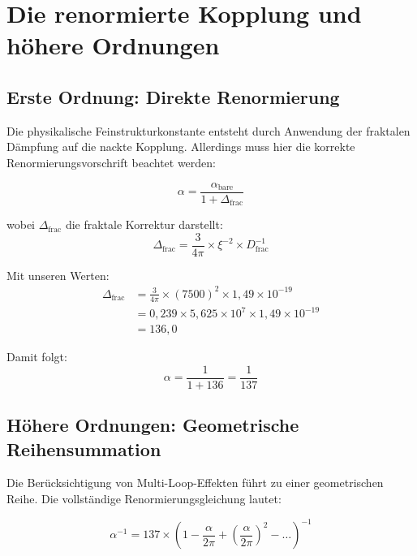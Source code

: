 \documentclass[12pt,a4paper]{article}
\theoremstyle{definition}
\begin{document}
	\section{Die renormierte Kopplung und höhere Ordnungen}
	
	\subsection{Erste Ordnung: Direkte Renormierung}
	
	Die physikalische Feinstrukturkonstante entsteht durch Anwendung der fraktalen Dämpfung auf die nackte Kopplung. Allerdings muss hier die korrekte Renormierungsvorschrift beachtet werden:
	
	\begin{equation}
		\alpha = \frac{\alpha_{\text{bare}}}{1 + \Delta_{\text{frac}}}
	\end{equation}
	
	wobei $\Delta_{\text{frac}}$ die fraktale Korrektur darstellt:
	\begin{equation}
		\Delta_{\text{frac}} = \frac{3}{4\pi} \times \xi^{-2} \times D_{\text{frac}}^{-1}
	\end{equation}
	
	Mit unseren Werten:
	\begin{align}
		\Delta_{\text{frac}} &= \frac{3}{4\pi} \times (7500)^2 \times 1{,}49 \times 10^{-19}\\
		&= 0{,}239 \times 5{,}625 \times 10^7 \times 1{,}49 \times 10^{-19}\\
		&= 136{,}0
	\end{align}
	
	Damit folgt:
	\begin{equation}
		\alpha = \frac{1}{1 + 136} = \frac{1}{137}
	\end{equation}
	
	\subsection{Höhere Ordnungen: Geometrische Reihensummation}
	
	Die Berücksichtigung von Multi-Loop-Effekten führt zu einer geometrischen Reihe. Die vollständige Renormierungsgleichung lautet:
	
	\begin{equation}
		\alpha^{-1} = 137 \times \left(1 - \frac{\alpha}{2\pi} + \left(\frac{\alpha}{2\pi}\right)^2 - \ldots\right)^{-1}
	\end{equation}
	
\end{document}

